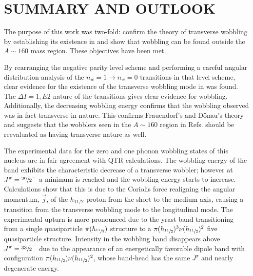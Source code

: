 %
%

\chapter{SUMMARY AND OUTLOOK}
\label{chp:wob-disc}

The purpose of this work was two-fold: confirm the theory of transverse wobbling by establishing its existence in \pr{} and show that wobbling can be found outside the $A\sim{}160$ mass region. These objectives have been met.

By rearranging the negative parity level scheme and performing a careful angular distribution analysis of the $n_w=1\rightarrow{}n_w=0$ transitions in that level scheme, clear evidence for the existence of the transverse wobbling mode in \pr{} was found. The $\Delta{}I=1, E2$ nature of the transitions gives clear evidence for wobbling. Additionally, the decreasing wobbling energy confirms that the wobbling observed was in fact transverse in nature. This confirms Frauendorf's and D\"onau's theory and suggests that the wobblers seen in the $A\sim{}160$ region in Refs. \cite{wobblingIn163Lu,wobblingIn163LuTwoPhonon,wobblingIn165Lu,wobblingIn167Lu,wobblingIn161Lu,wobblingIn167Ta} should be reevaluated as having transverse nature as well.

The experimental data for the zero and one phonon wobbling states of this nucleus are in fair agreement with QTR calculations. The wobbling energy of the band exhibits the characteristic decrease of a transverse wobbler; however at $J^{\pi}=\sfrac{29}{2}^-$ a minimum is reached and the wobbling energy starts to increase. Calculations show that this is due to the Coriolis force realigning the angular momentum, $\vec{j}$, of the $h_{11/2}$ proton from the short to the medium axis, causing a transition from the transverse wobbling mode to the longitudinal mode. The experimental upturn is more pronounced due to the yrast band transitioning from a single quasiparticle $\pi{}(h_{\sfrac{11}{2}})$ structure to a $\pi{}(h_{\sfrac{11}{2}})^3\nu{}(h_{\sfrac{11}{2}})^2$ five quasiparticle structure. Intensity in the wobbling band disappears above $J^{\pi}=\sfrac{33}{2}^-$ due to the appearance of an energetically favorable dipole band with configuration $\pi{}(h_{\sfrac{11}{2}})\nu{}(h_{\sfrac{11}{2}})^2$, whose band-head has the same $J^{\pi}$ and nearly degenerate energy.


